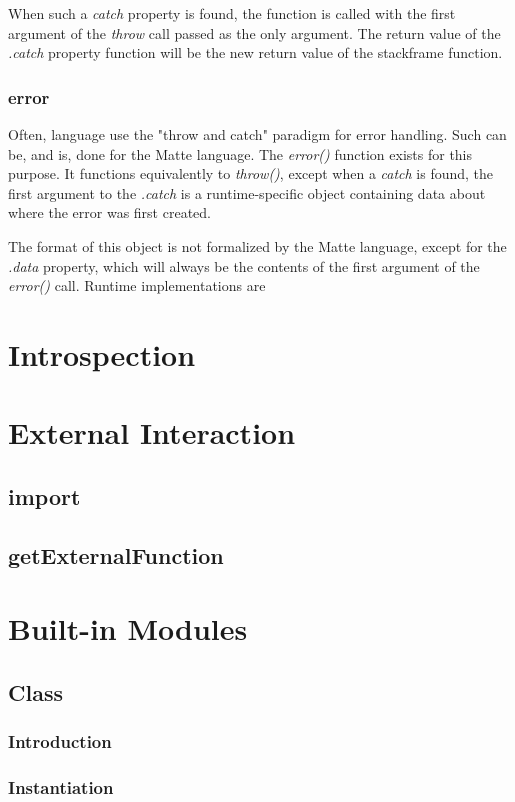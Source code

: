 \documentclass[12pt,letterpaper]{report}
\begin{document}
When such a \textit{catch} property is found, the function is called with the first argument of the \textit{throw}
call passed as the only argument. The return value of the \textit{.catch} property function will be 
the new return value of the stackframe function.



\subsection{error}

Often, language use the "throw and catch" paradigm for error handling. Such can be, and is, done 
for the Matte language. The \textit{error()} function exists for this purpose. It functions 
equivalently to \textit{throw()}, except when a \textit{catch} is found, the first argument 
to the \textit{.catch} is a runtime-specific object containing data about where the error 
was first created. 

The format of this object is not formalized by the Matte language, except for the 
\textit{.data} property, which will always be the contents of the first argument 
of the \textit{error()} call. Runtime implementations are 

\chapter{Introspection}
\chapter{External Interaction}
\section{import}
\section{getExternalFunction}
\chapter{Built-in Modules}
\section{Class}
\subsection{Introduction}
\subsection{Instantiation}
\end{document}
